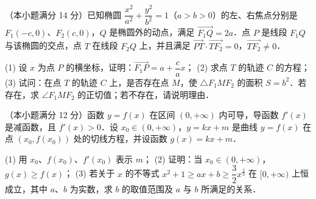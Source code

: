 \begin{question}
（本小题满分 14 分）已知椭圆 $\dfrac{x^2}{a^2} + \dfrac{y^2}{b^2} = 1$（$a > b > 0$）的左、右焦点分别是 $F_1(-c, 0)$、$F_2(c, 0)$，$Q$ 是椭圆外的动点，满足 $\overrightarrow{F_1Q} = 2a$．点 $P$ 是线段 $F_1Q$ 与该椭圆的交点，点 $T$ 在线段 $F_2Q$ 上，并且满足 $\overrightarrow{PT} \cdot \overrightarrow{TF_2} = 0$，$\overrightarrow{TF_2} \neq 0$．
\nopagebreak[4]
\begin{center}\end{center}
\nopagebreak[4]
(1) 设 $x$ 为点 $P$ 的横坐标，证明：$\overrightarrow{F_1P} = a + \dfrac{c}{a}x$；
(2) 求点 $T$ 的轨迹 $C$ 的方程；
(3) 试问：在点 $T$ 的轨迹 $C$ 上，是否存在点 $M$，使 $\triangle F_1MF_2$ 的面积 $S = b^2$．若存在，求 $\angle F_1MF_2$ 的正切值；若不存在，请说明理由．

\end{question}
\begin{question}
（本小题满分 12 分）函数 $y = f(x)$ 在区间 $(0, +\infty)$ 内可导，导函数 $f'(x)$ 是减函数，且 $f'(x) > 0$．设 $x_0 \in (0, +\infty)$，$y = kx + m$ 是曲线 $y = f(x)$ 在点 $(x_0, f(x_0))$ 处的切线方程，并设函数 $g(x) = kx + m$．

(1) 用 $x_0$、$f(x_0)$、$f'(x_0)$ 表示 $m$；
(2) 证明：当 $x_0 \in (0, +\infty)$，$g(x) \geqslant f(x)$；
(3) 若关于 $x$ 的不等式 $x^2 + 1 \geqslant ax + b \geqslant \dfrac{3}{2}x^{\frac{2}{3}}$ 在 $[0, +\infty)$ 上恒成立，其中 $a$、$b$ 为实数，求 $b$ 的取值范围及 $a$ 与 $b$ 所满足的关系．

\end{question}